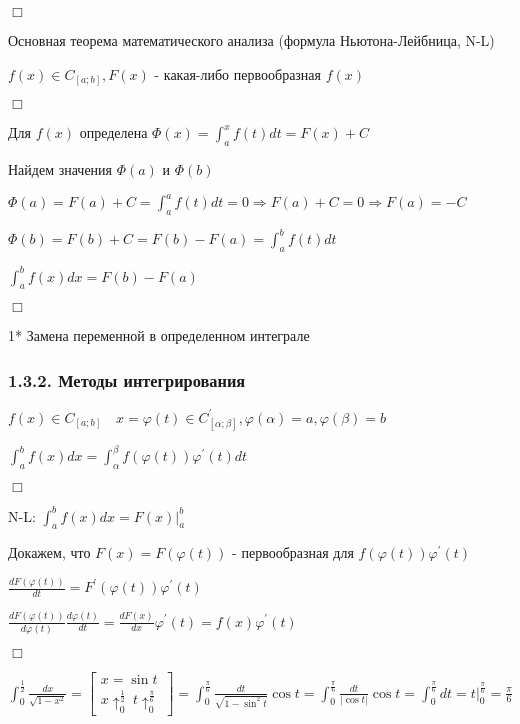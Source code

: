 \documentclass[12pt]{article}
\begin{document}
    $\Box$

    \Th \hypertarget{formulanewtonleibniz}{Основная теорема математического анализа} (формула Ньютона-Лейбница, N-L)

    $f(x) \in C_{[a;b]}, F(x)$ - какая-либо первообразная $f(x)$


    $\Box$

    Для $f(x)$ определена $\Phi(x) = \int_a^x f(t)dt = F(x) + C$

    Найдем значения $\Phi(a)$ и $\Phi(b)$

    $\Phi(a) = F(a) + C = \int^a_a f(t)dt = 0 \Longrightarrow F(a) + C = 0 \Longrightarrow F(a) = -C$

    $\Phi(b) = F(b) + C = F(b) - F(a) = \int^b_a f(t) dt$

    $\int^b_a f(x)dx = F(b) - F(a)$

    $\Box$



    1* \hypertarget{integralsubstitution}{Замена переменной в определенном интеграле}
    \subsubsection{1.3.2. Методы интегрирования}

    \Th $f(x) \in C_{[a;b]} \quad x = \varphi(t) \in C^\prime_{[\alpha;\beta]}, \varphi(\alpha) = a, \varphi(\beta) = b$

    $\int^b_a f(x)dx = \int^\beta_\alpha f(\varphi(t)) \varphi^\prime(t) dt$

    $\Box$

    N-L: $\int^b_a f(x)dx = F(x) \Big|_a^b$

    Докажем, что $F(x) = F(\varphi(t))$ - первообразная для $f(\varphi(t))\varphi^\prime(t)$

    $\frac{dF(\varphi(t))}{dt} = F^\prime(\varphi(t)) \varphi^\prime(t)$

    $\frac{dF(\varphi(t))}{d\varphi(t)}\frac{d\varphi(t)}{dt} = \frac{dF(x)}{dx} \varphi^\prime(t) = f(x)\varphi^\prime(t)$

    $\Box$

    \Ex $\int_0^{\frac{1}{2}} \frac{dx}{\sqrt{1 - x^2}} = \begin{bmatrix}
                                                              x = \sin t \\ x \uparrow^\frac{1}{2}_0 \ t \uparrow_0^\frac{\pi}{6}
    \end{bmatrix} =
    \int_0^\frac{\pi}{6} \frac{dt}{\sqrt{1 - \sin^2 t}}\cos t =
    \int_0^\frac{\pi}{6} \frac{dt}{|\cos t|} \cos t = \int_0^\frac{\pi}{6} dt = t \Big|_0^\frac{\pi}{6} = \frac{\pi}{6}$
\end{document}
